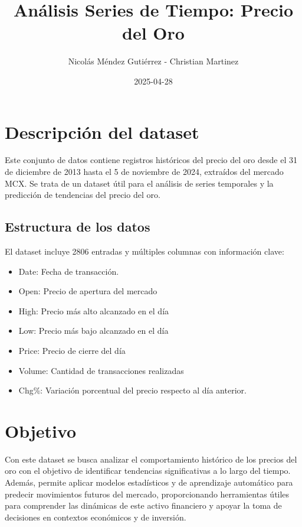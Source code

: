 \documentclass[
]{book}
\title{Análisis Series de Tiempo: Precio del Oro}
\author{Nicolás Méndez Gutiérrez - Christian Martinez}
\date{2025-04-28}
\providecommand{\tightlist}{%
  \setlength{\itemsep}{0pt}\setlength{\parskip}{0pt}}
\begin{document}
\maketitle

{
\setcounter{tocdepth}{1}
\tableofcontents
}
\chapter{Descripción del dataset}\label{descripciuxf3n-del-dataset}

Este conjunto de datos contiene registros históricos del precio del oro desde el 31 de diciembre de 2013 hasta el 5 de noviembre de 2024, extraídos del mercado MCX. Se trata de un dataset útil para el análisis de series temporales y la predicción de tendencias del precio del oro.

\section{Estructura de los datos}\label{estructura-de-los-datos}

El dataset incluye 2806 entradas y múltiples columnas con información clave:

\begin{itemize}
\tightlist
\item
  Date: Fecha de transacción.
\item
  Open: Precio de apertura del mercado
\item
  High: Precio más alto alcanzado en el día
\item
  Low: Precio más bajo alcanzado en el día
\item
  Price: Precio de cierre del día
\item
  Volume: Cantidad de transacciones realizadas
\item
  Chg\%: Variación porcentual del precio respecto al día anterior.
\end{itemize}

\chapter{Objetivo}\label{objetivo}

Con este dataset se busca analizar el comportamiento histórico de los precios del oro con el objetivo de identificar tendencias significativas a lo largo del tiempo. Además, permite aplicar modelos estadísticos y de aprendizaje automático para predecir movimientos futuros del mercado, proporcionando herramientas útiles para comprender las dinámicas de este activo financiero y apoyar la toma de decisiones en contextos económicos y de inversión.
\end{document}
